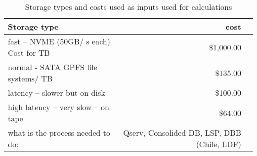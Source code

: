 \tiny \begin{longtable} { |p{}  |r  |r |} 
\caption{Storage types and costs used as inputs used for calculations \label{tab:Storage}}\\ 
\hline 
{Storage type }&{cost} \\ \hline
{fast -- NVME (50GB/ s each) Cost for TB  }&{\$1,000.00} \\ \hline
{normal - SATA GPFS file systems/ TB  }&{\$135.00} \\ \hline
{latency -- slower but on disk }&{\$100.00} \\ \hline
{high latency -- very slow -- on tape }&{\$64.00} \\ \hline
{what is the process needed to do: }&{Qserv, Consolided DB, LSP, DBB (Chile, LDF) } \\ \hline
\end{longtable} \normalsize
